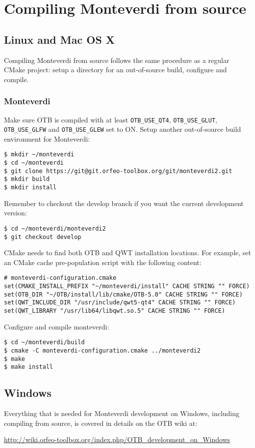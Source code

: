 \setcounter{secnumdepth}{3}

\chapter{Compiling Monteverdi from source}
\label{chapter:CompilingMonteverdi}

\section{Linux and Mac OS X}

Compiling Monteverdi from source follows the same procedure as a regular CMake project: setup a directory for an
out-of-source build, configure and compile.

\subsection{Monteverdi}

Make sure OTB is compiled with at least \texttt{OTB\_USE\_QT4}, \texttt{OTB\_USE\_GLUT}, \texttt{OTB\_USE\_GLFW} and \texttt{OTB\_USE\_GLEW} set to ON.
Setup another out-of-source build environment for Monteverdi:
\begin{verbatim}
$ mkdir ~/monteverdi
$ cd ~/monteverdi
$ git clone https://git@git.orfeo-toolbox.org/git/monteverdi2.git
$ mkdir build
$ mkdir install
\end{verbatim}

Remember to checkout the develop branch if you want the current development version:
\begin{verbatim}
$ cd ~/monteverdi/monteverdi2
$ git checkout develop
\end{verbatim}

CMake needs to find both OTB and QWT installation locations.
For example, set an CMake cache pre-population script with the following content:
\begin{verbatim}
# monteverdi-configuration.cmake
set(CMAKE_INSTALL_PREFIX "~/monteverdi/install" CACHE STRING "" FORCE)
set(OTB_DIR "~/OTB/install/lib/cmake/OTB-5.0" CACHE STRING "" FORCE)
set(QWT_INCLUDE_DIR "/usr/include/qwt5-qt4" CACHE STRING "" FORCE)
set(QWT_LIBRARY "/usr/lib64/libqwt.so.5" CACHE STRING "" FORCE)
\end{verbatim}

Configure and compile monteverdi:
\begin{verbatim}
$ cd ~/monteverdi/build
$ cmake -C monteverdi-configuration.cmake ../monteverdi2
$ make
$ make install
\end{verbatim}

\section{Windows}

Everything that is needed for Monteverdi development on Windows, including compiling from source, is covered in details on the OTB wiki at:
\begin{center}
\url{http://wiki.orfeo-toolbox.org/index.php/OTB_development_on_Windows}
\end{center}
